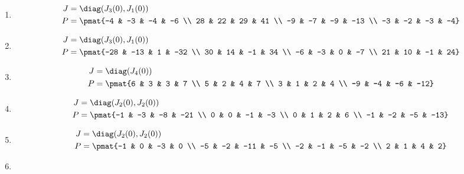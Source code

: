 \begin{enumerate}
\item

\begin{align*}
J &= \diag(J_{3}(0), J_{1}(0))\\
P &= \pmat{-4 & -3 & -4 & -6 \\ 28 & 22 & 29 & 41 \\ -9 & -7 & -9 & -13 \\ -3 & -2 & -3 & -4}
\end{align*}

\item

\begin{align*}
J &= \diag(J_{3}(0), J_{1}(0))\\
P &= \pmat{-28 & -13 & 1 & -32 \\ 30 & 14 & -1 & 34 \\ -6 & -3 & 0 & -7 \\ 21 & 10 & -1 & 24}
\end{align*}

\item

\begin{align*}
J &= \diag(J_{4}(0))\\
P &= \pmat{6 & 3 & 3 & 7 \\ 5 & 2 & 4 & 7 \\ 3 & 1 & 2 & 4 \\ -9 & -4 & -6 & -12}
\end{align*}

\item

\begin{align*}
J &= \diag(J_{2}(0), J_{2}(0))\\
P &= \pmat{-1 & -3 & -8 & -21 \\ 0 & 0 & -1 & -3 \\ 0 & 1 & 2 & 6 \\ -1 & -2 & -5 & -13}
\end{align*}

\item

\begin{align*}
J &= \diag(J_{2}(0), J_{2}(0))\\
P &= \pmat{-1 & 0 & -3 & 0 \\ -5 & -2 & -11 & -5 \\ -2 & -1 & -5 & -2 \\ 2 & 1 & 4 & 2}
\end{align*}

\item


\end{enumerate}
